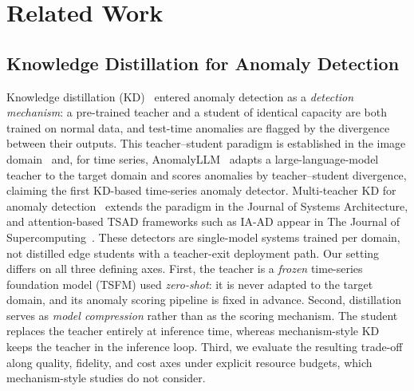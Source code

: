 \section{Related Work}\label{sec:related}

\subsection{Knowledge Distillation for Anomaly Detection}
Knowledge distillation (KD)~\cite{hinton2015kd} entered anomaly detection as a
\emph{detection mechanism}: a pre-trained teacher and a student of identical
capacity are both trained on normal data, and test-time anomalies are flagged
by the divergence between their outputs. This teacher--student paradigm is
established in the image domain~\cite{unifiededge2024} and, for time
series, AnomalyLLM~\cite{anomalyllm2024} adapts a large-language-model teacher
to the target domain and scores anomalies by teacher--student divergence,
claiming the first KD-based time-series anomaly detector. Multi-teacher KD for anomaly detection~\cite{ma2023multiteacher} extends the
paradigm in the Journal of Systems Architecture, and attention-based TSAD
frameworks such as IA-AD appear in The Journal of Supercomputing~\cite{iaad2025}. These detectors are single-model systems trained per domain, not distilled edge
students with a teacher-exit deployment path. Our setting differs
on all three defining axes. First, the teacher is a \emph{frozen}
time-series foundation model (TSFM) used \emph{zero-shot}: it is never adapted
to the target domain, and its anomaly scoring pipeline is fixed in advance.
Second, distillation serves as \emph{model compression} rather than as the
scoring mechanism. The student replaces the teacher entirely at inference
time, whereas mechanism-style KD keeps the teacher in the inference loop.
Third, we evaluate the resulting trade-off along quality, fidelity, and cost
axes under explicit resource budgets, which mechanism-style studies do not
consider.

